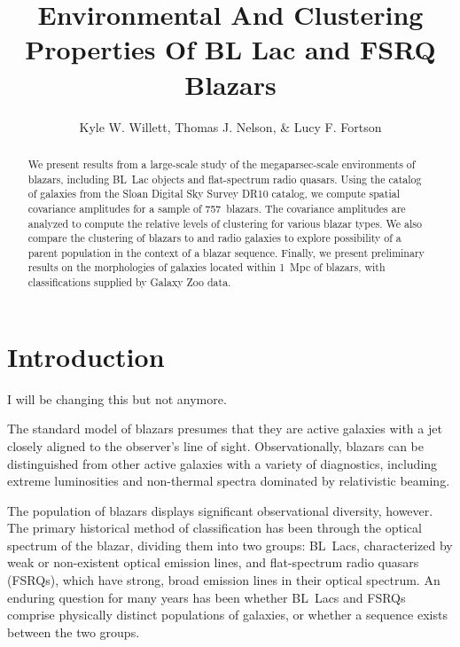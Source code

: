 \documentclass{emulateapj}
\begin{document}
\title{Environmental And Clustering Properties Of BL Lac and FSRQ Blazars}

\author{Kyle W. Willett, Thomas J. Nelson, \& Lucy F. Fortson}


\begin{abstract}
We present results from a large-scale study of the megaparsec-scale environments of blazars, including BL~Lac objects and flat-spectrum radio quasars. Using the catalog of galaxies from the Sloan Digital Sky Survey DR10 catalog, we compute spatial covariance amplitudes for a sample of 757~blazars. The covariance amplitudes are analyzed to compute the relative levels of clustering for various blazar types. We also compare the clustering of blazars to \FRI{} and \FRII{} radio galaxies to explore possibility of a parent population in the context of a blazar sequence. Finally, we present preliminary results on the morphologies of galaxies located within 1~Mpc of blazars, with classifications supplied by Galaxy Zoo data.
\end{abstract}


\section{Introduction} \label{sec-intro}


I will be changing this but not anymore.

The standard model of blazars presumes that they are active galaxies with a jet closely aligned to the observer's line of sight. Observationally, blazars can be distinguished from other active galaxies with a variety of diagnostics, including extreme luminosities and non-thermal spectra dominated by relativistic beaming. 

The population of blazars displays significant observational diversity, however. The primary historical method of classification has been through the optical spectrum of the blazar, dividing them into two groups: BL~Lacs, characterized by weak or non-existent optical emission lines, and flat-spectrum radio quasars (FSRQs), which have strong, broad emission lines in their optical spectrum. An enduring question for many years has been whether BL~Lacs and FSRQs comprise physically distinct populations of galaxies, or whether a sequence exists between the two groups. 
\end{document}
